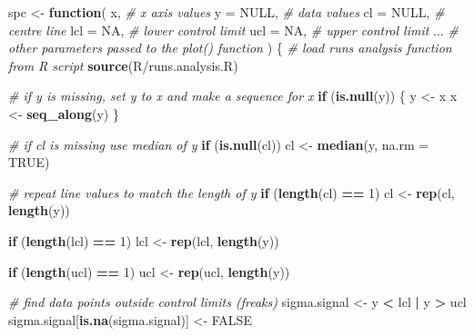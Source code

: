 \documentclass[
]{book}
\newenvironment{Shaded}{\begin{snugshade}}{\end{snugshade}}
\newcommand{\AttributeTok}[1]{\textcolor[rgb]{0.13,0.29,0.53}{#1}}
\newcommand{\CommentTok}[1]{\textcolor[rgb]{0.56,0.35,0.01}{\textit{#1}}}
\newcommand{\ConstantTok}[1]{\textcolor[rgb]{0.56,0.35,0.01}{#1}}
\newcommand{\ControlFlowTok}[1]{\textcolor[rgb]{0.13,0.29,0.53}{\textbf{#1}}}
\newcommand{\DecValTok}[1]{\textcolor[rgb]{0.00,0.00,0.81}{#1}}
\newcommand{\FunctionTok}[1]{\textcolor[rgb]{0.13,0.29,0.53}{\textbf{#1}}}
\newcommand{\NormalTok}[1]{#1}
\newcommand{\OtherTok}[1]{\textcolor[rgb]{0.56,0.35,0.01}{#1}}
\newcommand{\SpecialCharTok}[1]{\textcolor[rgb]{0.81,0.36,0.00}{\textbf{#1}}}
\newcommand{\StringTok}[1]{\textcolor[rgb]{0.31,0.60,0.02}{#1}}
\begin{document}
\begin{Shaded}
\begin{Highlighting}[numbers=left,,]
\NormalTok{spc }\OtherTok{\textless{}{-}} \ControlFlowTok{function}\NormalTok{(}
\NormalTok{    x,           }\CommentTok{\# x axis values}
    \AttributeTok{y   =} \ConstantTok{NULL}\NormalTok{,  }\CommentTok{\# data values}
    \AttributeTok{cl  =} \ConstantTok{NULL}\NormalTok{,  }\CommentTok{\# centre line}
    \AttributeTok{lcl =} \ConstantTok{NA}\NormalTok{,    }\CommentTok{\# lower control limit}
    \AttributeTok{ucl =} \ConstantTok{NA}\NormalTok{,    }\CommentTok{\# upper control limit}
\NormalTok{    ...          }\CommentTok{\# other parameters passed to the plot() function}
\NormalTok{) \{}
  \CommentTok{\# load runs analysis function from R script}
  \FunctionTok{source}\NormalTok{(}\StringTok{\textquotesingle{}R/runs.analysis.R\textquotesingle{}}\NormalTok{)}
  
  \CommentTok{\# if y is missing, set y to x and make a sequence for x}
  \ControlFlowTok{if}\NormalTok{ (}\FunctionTok{is.null}\NormalTok{(y)) \{}
\NormalTok{    y }\OtherTok{\textless{}{-}}\NormalTok{ x}
\NormalTok{    x }\OtherTok{\textless{}{-}} \FunctionTok{seq\_along}\NormalTok{(y)}
\NormalTok{  \}}
  
  \CommentTok{\# if cl is missing use median of y}
  \ControlFlowTok{if}\NormalTok{ (}\FunctionTok{is.null}\NormalTok{(cl))}
\NormalTok{    cl }\OtherTok{\textless{}{-}} \FunctionTok{median}\NormalTok{(y, }\AttributeTok{na.rm =} \ConstantTok{TRUE}\NormalTok{)}
  
  \CommentTok{\# repeat line values to match the length of y}
  \ControlFlowTok{if}\NormalTok{ (}\FunctionTok{length}\NormalTok{(cl) }\SpecialCharTok{==} \DecValTok{1}\NormalTok{)}
\NormalTok{    cl }\OtherTok{\textless{}{-}} \FunctionTok{rep}\NormalTok{(cl, }\FunctionTok{length}\NormalTok{(y))}
  
  \ControlFlowTok{if}\NormalTok{ (}\FunctionTok{length}\NormalTok{(lcl) }\SpecialCharTok{==} \DecValTok{1}\NormalTok{)}
\NormalTok{    lcl }\OtherTok{\textless{}{-}} \FunctionTok{rep}\NormalTok{(lcl, }\FunctionTok{length}\NormalTok{(y))}
  
  \ControlFlowTok{if}\NormalTok{ (}\FunctionTok{length}\NormalTok{(ucl) }\SpecialCharTok{==} \DecValTok{1}\NormalTok{)}
\NormalTok{    ucl }\OtherTok{\textless{}{-}} \FunctionTok{rep}\NormalTok{(ucl, }\FunctionTok{length}\NormalTok{(y))}
  
  \CommentTok{\# find data points outside control limits (freaks)}
\NormalTok{  sigma.signal }\OtherTok{\textless{}{-}}\NormalTok{ y }\SpecialCharTok{\textless{}}\NormalTok{ lcl }\SpecialCharTok{|}\NormalTok{ y }\SpecialCharTok{\textgreater{}}\NormalTok{ ucl}
\NormalTok{  sigma.signal[}\FunctionTok{is.na}\NormalTok{(sigma.signal)] }\OtherTok{\textless{}{-}} \ConstantTok{FALSE}
  

\end{Highlighting}
\end{Shaded}
\end{document}
